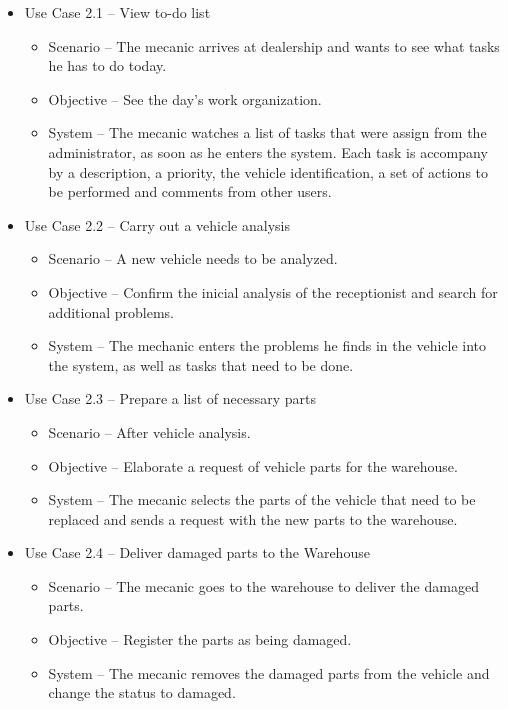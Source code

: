  \begin{itemize}
    \item Use Case 2.1 – View to-do list
    \begin{itemize}
      \item Scenario – The mecanic arrives at dealership and wants to see what tasks he has to do today.
      \item Objective – See the day's work organization.
      \item System – The mecanic watches a list of tasks that were assign from the administrator, as soon as he enters the system. Each task is accompany by a description, a priority, the vehicle identification, a set of actions to be performed and comments from other users. 
    \end{itemize}
    \item Use Case 2.2 – Carry out a vehicle analysis 
    \begin{itemize}
      \item Scenario – A new vehicle needs to be analyzed.
      \item Objective – Confirm the inicial analysis of the receptionist and search for additional problems.
      \item System – The mechanic enters the problems he finds in the vehicle into the system, as well as tasks that need to be done. 
    \end{itemize}
    \item Use Case 2.3 – Prepare a list of necessary parts
    \begin{itemize}
      \item Scenario – After vehicle analysis.
      \item Objective – Elaborate a request of vehicle parts for the warehouse.
      \item System – The mecanic selects the parts of the vehicle that need to be replaced and sends a request with the new parts to the warehouse.
    \end{itemize}
    \item Use Case 2.4 – Deliver damaged parts to the Warehouse
    \begin{itemize}
      \item Scenario – The mecanic goes to the warehouse to deliver the damaged parts.
      \item Objective – Register the parts as being damaged.
      \item System – The mecanic removes the damaged parts from the vehicle and change the status to damaged.

\end{itemize}
\end{itemize}
